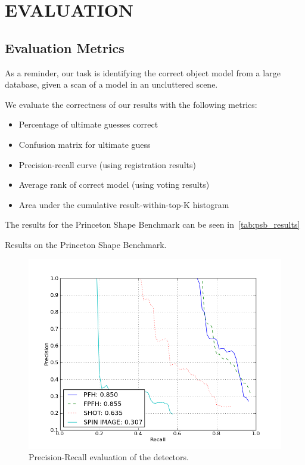 \section{EVALUATION}

\subsection{Evaluation Metrics}
As a reminder, our task is identifying the correct object model from a large database, given a scan of a model in an uncluttered scene.

We evaluate the correctness of our results with the following metrics:
\begin{itemize}
  \item Percentage of ultimate guesses correct
  \item Confusion matrix for ultimate guess
  \item Precision-recall curve (using registration results)
  \item Average rank of correct model (using voting results)
  \item Area under the cumulative result-within-top-K histogram
\end{itemize}

The results for the Princeton Shape Benchmark can be seen in~\ref{tab:psb_results}
\begin{table}
  \centering
  
  \caption{Results on the Princeton Shape Benchmark.}
  \label{tab:psb_results}
\end{table}

\begin{figure}[thpb]
\centering
\includegraphics[width=1\linewidth]{../figures/PFH-FPFH-SHOT-SPIN_IMAGE_pr.png}
\caption{Precision-Recall evaluation of the detectors.}
\label{fig:pr}
\end{figure}

